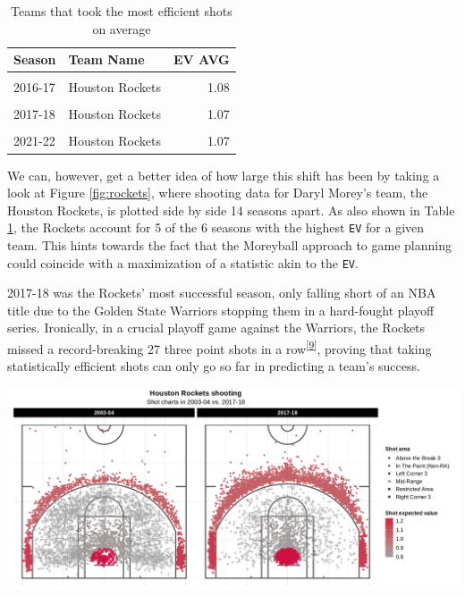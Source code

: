 \documentclass[
  12pt,
  a4paper,
]{article}
\let\origfigure\figure
\let\endorigfigure\endfigure
\renewenvironment{figure}[1][2] {
    \expandafter\origfigure\expandafter[H]
} {
    \endorigfigure
}
\begin{document}
\begin{table}

\caption{\label{tab:analytical}Teams that took
                 the most efficient shots on average}
\centering
\begin{tabular}[t]{llr}
\toprule
Season & Team Name & EV AVG\\
\midrule
\cellcolor{gray!30}{2019-20} & \cellcolor{gray!30}{Houston Rockets} & \cellcolor{gray!30}{1.08}\\
2016-17 & Houston Rockets & 1.08\\
\cellcolor{gray!30}{2018-19} & \cellcolor{gray!30}{Milwaukee Bucks} & \cellcolor{gray!30}{1.07}\\
2017-18 & Houston Rockets & 1.07\\
\cellcolor{gray!30}{2018-19} & \cellcolor{gray!30}{Houston Rockets} & \cellcolor{gray!30}{1.07}\\
2021-22 & Houston Rockets & 1.07\\
\bottomrule
\end{tabular}
\end{table}

We can, however, get a better idea of how large this shift has been by taking a look at Figure \ref{fig:rockets}, where shooting data for Daryl Morey's team, the Houston Rockets, is plotted side by side 14 seasons apart. As also shown in Table \ref{tab:analytical}, the Rockets account for 5 of the 6 seasons with the highest \texttt{EV} for a given team. This hints towards the fact that the Moreyball approach to game planning could coincide with a maximization of a statistic akin to the \texttt{EV}.

2017-18 was the Rockets' most successful season, only falling short of an NBA title due to the Golden State Warriors stopping them in a hard-fought playoff series. Ironically, in a crucial playoff game against the Warriors, the Rockets missed a record-breaking 27 three point shots in a row\textsuperscript{{[}\protect\hyperlink{ref-Rockets27}{9}{]}}, proving that taking statistically efficient shots can only go so far in predicting a team's success.

\begin{figure}

{\centering \includegraphics[width=1\linewidth]{latex/plotspng/plot_4} 

}

\caption{Houston Rockets shooting charts in 2003-04 and 2017-18}\label{fig:rockets}
\end{figure}
\end{document}
